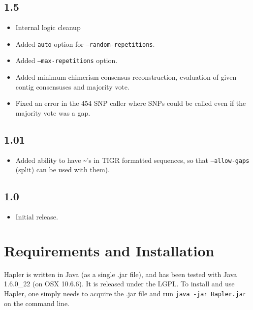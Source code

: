 \documentclass[11pt]{llncs}
\begin{document}
	\subsection*{1.5}
\begin{itemize}
\item Internal logic cleanup
\item Added \texttt{auto} option for \texttt{--random-repetitions}. 
\item Added \texttt{--max-repetitions} option.
\item Added minimum-chimerism consensus reconstruction, evaluation of given contig consensuses and majority vote.
\item Fixed an error in the 454 SNP caller where SNPs could be called even if the majority vote was a gap.
\end{itemize}

	\subsection*{1.01}
\begin{itemize}
\item Added ability to have \texttt{\~}'s in TIGR formatted sequences, so that \texttt{--allow-gaps} (split) can be used with them).
\end{itemize}

	\subsection*{1.0}
\begin{itemize}
\item Initial release.
\end{itemize}




\newpage

\section{Requirements and Installation}
\label{requirementsAndInstallation}

Hapler is written in Java (as a single .jar file), and has been tested with Java 1.6.0\_22 (on OSX 10.6.6). It is released under the LGPL. To install
and use Hapler, one simply needs to acquire the .jar file and run \texttt{java -jar Hapler.jar} on the command line.





\newpage
\end{document}
